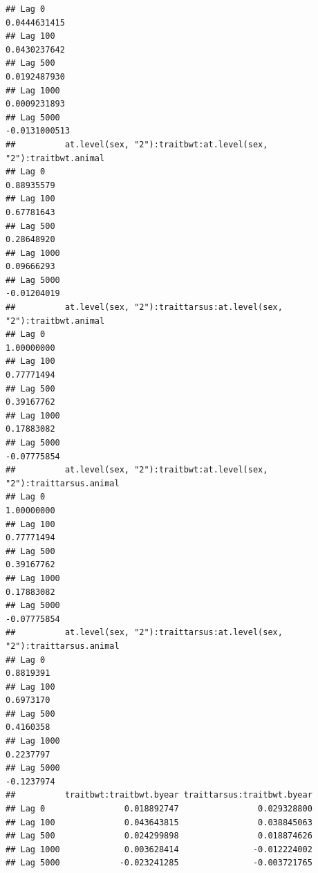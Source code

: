 \documentclass[
  12pt,
]{book}
\begin{document}
\begin{verbatim}
## Lag 0                                                            0.0444631415
## Lag 100                                                          0.0430237642
## Lag 500                                                          0.0192487930
## Lag 1000                                                         0.0009231893
## Lag 5000                                                        -0.0131000513
##          at.level(sex, "2"):traitbwt:at.level(sex, "2"):traitbwt.animal
## Lag 0                                                        0.88935579
## Lag 100                                                      0.67781643
## Lag 500                                                      0.28648920
## Lag 1000                                                     0.09666293
## Lag 5000                                                    -0.01204019
##          at.level(sex, "2"):traittarsus:at.level(sex, "2"):traitbwt.animal
## Lag 0                                                           1.00000000
## Lag 100                                                         0.77771494
## Lag 500                                                         0.39167762
## Lag 1000                                                        0.17883082
## Lag 5000                                                       -0.07775854
##          at.level(sex, "2"):traitbwt:at.level(sex, "2"):traittarsus.animal
## Lag 0                                                           1.00000000
## Lag 100                                                         0.77771494
## Lag 500                                                         0.39167762
## Lag 1000                                                        0.17883082
## Lag 5000                                                       -0.07775854
##          at.level(sex, "2"):traittarsus:at.level(sex, "2"):traittarsus.animal
## Lag 0                                                               0.8819391
## Lag 100                                                             0.6973170
## Lag 500                                                             0.4160358
## Lag 1000                                                            0.2237797
## Lag 5000                                                           -0.1237974
##          traitbwt:traitbwt.byear traittarsus:traitbwt.byear
## Lag 0                0.018892747                0.029328800
## Lag 100              0.043643815                0.038845063
## Lag 500              0.024299898                0.018874626
## Lag 1000             0.003628414               -0.012224002
## Lag 5000            -0.023241285               -0.003721765

\end{verbatim}
\end{document}
